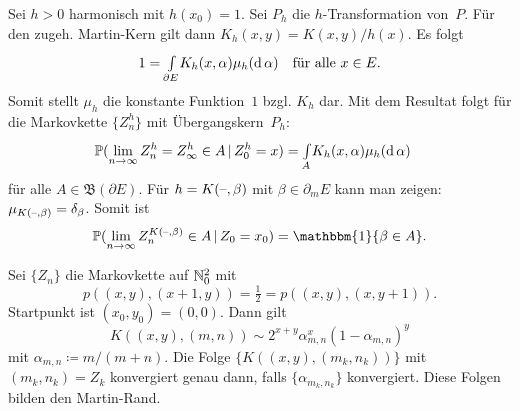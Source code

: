 \documentclass{cheat-sheet}
\renewcommand{\P}{\mathbb{P}} %
\newcommand{\ind}{\mathbbm{1}} %
\newcommand{\Bor}{\mathfrak{B}} %
\begin{document}
\begin{bem}
  Sei $h > 0$ harmonisch mit $h(x_0) = 1$.
  Sei $P_h$ die $h$-Transformation von~$P$.
  Für den zugeh. Martin-Kern gilt dann $K_h(x, y) = K(x, y) / h(x)$.
  Es folgt
  \[
    1 = {\textstyle \int\limits_{\partial E}^{}} K_h(x, \alpha) \mu_h(\mathrm{d}\,\alpha) \quad
    \text{für alle } x \in E.
  \]
  Somit stellt $\mu_h$ die konstante Funktion~$1$ bzgl. $K_h$ dar.
  Mit dem Resultat folgt für die Markovkette $\{ Z_n^h \}$ mit Übergangskern~$P_h$:
  \[
    \P(\lim_{n \to \infty} Z_n^h = Z_\infty^h \in A \,|\, Z_0^h = x) = \myint{A}{} K_h(x, \alpha) \mu_h(\d\,\alpha) \quad
  \]
  für alle $A \in \Bor(\partial E)$.
  Für $h = K(\text{--}, \beta)$ mit $\beta \in \partial_m E$ kann man zeigen: $\mu_{K(\text{--}, \beta)} = \delta_\beta$.
  Somit ist
  \[
    \P(\lim_{n \to \infty} Z_n^{K(\blank, \beta)} \in A \,|\, Z_0 = x_0) = \ind \{ \beta \in A \}.
  \]
\end{bem}

\begin{bsp}
  Sei $\{ Z_n \}$ die Markovkette auf $\mathbb{N}_0^2$ mit
  \[
    p((x, y), (x+1, y)) = \tfrac{1}{2} = p((x, y), (x, y+1)).
  \]
  Startpunkt ist $(x_0, y_0) = (0, 0)$.
  Dann gilt
  \[
    K((x, y), (m, n)) \sim
    2^{x+y} \alpha_{m,n}^x (1-\alpha_{m,n})^y
  \]
  mit $\alpha_{m,n} \coloneqq m / (m+n)$.
  Die Folge $\{ K((x, y), (m_k, n_k)) \}$ mit $(m_k, n_k) = Z_k$ konvergiert genau dann, falls $\{ \alpha_{m_k,n_k} \}$ konvergiert.
  Diese Folgen bilden den Martin-Rand.
\end{bsp}
\end{document}

